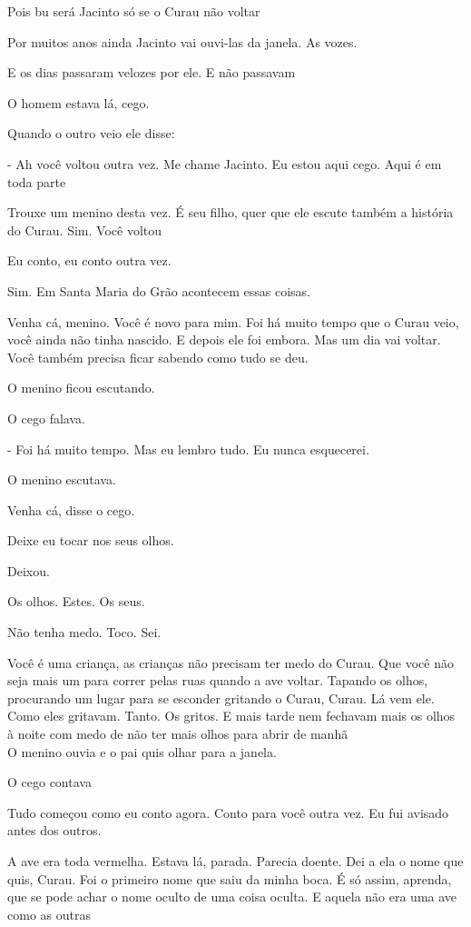 Pois bu será Jacinto só se o Curau não voltar

\pagebreak

Por muitos anos ainda Jacinto vai ouvi-las da janela. As vozes.

E os dias passaram velozes por ele. E não passavam

\pagebreak
\clearpage
\thispagestyle{empty}

\movetooddpage
O homem estava lá, cego.

Quando o outro veio ele disse:

- Ah você voltou outra vez. Me chame Jacinto. Eu estou aqui cego. Aqui é
em toda parte

Trouxe um menino desta vez. É seu filho, quer que ele escute também a
história do Curau. Sim. Você voltou

Eu conto, eu conto outra vez.

Sim. Em Santa Maria do Grão acontecem essas coisas.

Venha cá, menino. Você é novo para mim. Foi há muito tempo que o Curau
veio, você ainda não tinha nascido. E depois ele foi embora. Mas um dia
vai voltar. Você também precisa ficar sabendo como tudo se deu.

O menino ficou escutando.

O cego falava.

- Foi há muito tempo. Mas eu lembro tudo. Eu nunca esquecerei.

O menino escutava.

Venha cá, disse o cego.

Deixe eu tocar nos seus olhos.

Deixou.

Os olhos. Estes. Os seus.

Não tenha medo. Toco. Sei.

Você é uma criança, as crianças não precisam ter medo do Curau. Que você
não seja mais um para correr pelas ruas quando a ave voltar. Tapando os
olhos, procurando um lugar para se esconder gritando o Curau, Curau. Lá
vem ele. Como eles gritavam. Tanto. Os gritos. E mais tarde nem fechavam
mais os olhos à noite com medo de não ter mais olhos para abrir de manhã\\

O menino ouvia e o pai quis olhar para a janela.

O cego contava

Tudo começou como eu conto agora. Conto para você outra vez. Eu fui
avisado antes dos outros.

A ave era toda vermelha. Estava lá, parada. Parecia doente. Dei a ela o
nome que quis, Curau. Foi o primeiro nome que saiu da minha boca. É só
assim, aprenda, que se pode achar o nome oculto de uma coisa oculta. E
aquela não era uma ave como as outras\\

